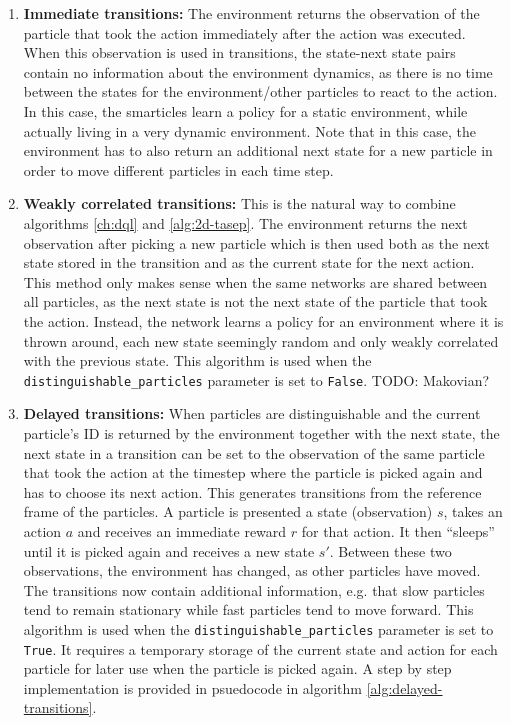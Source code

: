 \begin{enumerate}
    \item \textbf{Immediate transitions:} The environment returns the observation of the particle that took the action immediately after the action was executed. When this observation is used in transitions, the state-next state pairs contain no information about the environment dynamics, as there is no time between the states for the environment/other particles to react to the action. In this case, the smarticles learn a policy for a static environment, while actually living in a very dynamic environment. Note that in this case, the environment has to also return an additional next state for a new particle in order to move different particles in each time step.
    \item \textbf{Weakly correlated transitions:} This is the natural way to combine algorithms \ref{ch:dql} and \ref{alg:2d-tasep}. The environment returns the next observation after picking a new particle which is then used both as the next state stored in the transition and as the current state for the next action. This method only makes sense when the same networks are shared between all particles, as the next state is not the next state of the particle that took the action. Instead, the network learns a policy for an environment where it is thrown around, each new state seemingly random and only weakly correlated with the previous state. This algorithm is used when the \texttt{distinguishable\_particles} parameter is set to \texttt{False}. TODO: Makovian?
    \item \textbf{Delayed transitions:} When particles are distinguishable and the current particle's ID is returned by the environment together with the next state, the next state in a transition can be set to the observation of the same particle that took the action at the timestep where the particle is picked again and has to choose its next action. This generates transitions from the reference frame of the particles. A particle is presented a state (observation) $s$, takes an action $a$ and receives an immediate reward $r$ for that action. It then \enquote{sleeps} until it is picked again and receives a new state $s'$. Between these two observations, the environment has changed, as other particles have moved. The transitions now contain additional information, e.g. that slow particles tend to remain stationary while fast particles tend to move forward. This algorithm is used when the \texttt{distinguishable\_particles} parameter is set to \texttt{True}. It requires a temporary storage of the current state and action for each particle for later use when the particle is picked again. A step by step implementation is provided in psuedocode in algorithm \ref{alg:delayed-transitions}.
\end{enumerate}

